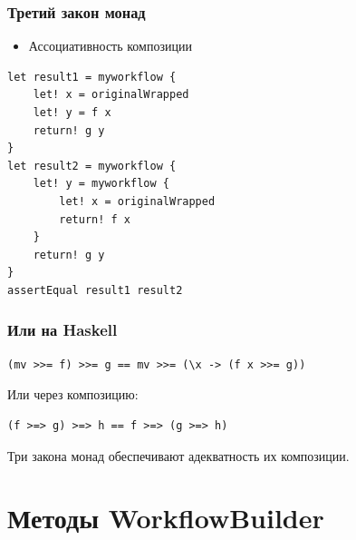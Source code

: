 \documentclass{../../slides-style}
\begin{document}
    \begin{frame}[fragile]
        \frametitle{Третий закон монад}
        \begin{itemize}
            \item Ассоциативность композиции
        \end{itemize}
        \begin{verbatim}
let result1 = myworkflow { 
    let! x = originalWrapped
    let! y = f x 
    return! g y  
}
let result2 = myworkflow { 
    let! y = myworkflow { 
        let! x = originalWrapped
        return! f x
    }
    return! g y
}
assertEqual result1 result2
        \end{verbatim}
    \end{frame}

    \begin{frame}[fragile]
        \frametitle{Или на Haskell}
        \begin{verbatim}
(mv >>= f) >>= g == mv >>= (\x -> (f x >>= g))
        \end{verbatim}
        \vspace{5mm}
        Или через композицию:
        \begin{verbatim}
(f >=> g) >=> h == f >=> (g >=> h)
        \end{verbatim}
        \vspace{5mm}

        Три закона монад обеспечивают адекватность их композиции.
    \end{frame}

    \section{Методы WorkflowBuilder}
\end{document}
